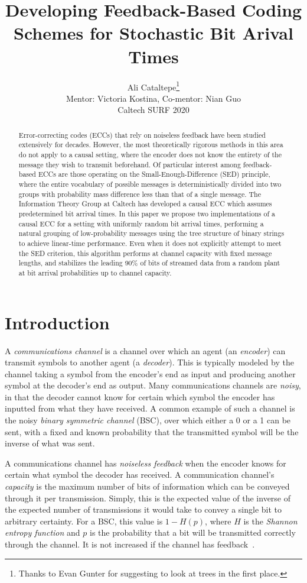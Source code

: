 \documentclass{IEEEtran}
\title{Developing Feedback-Based Coding Schemes for Stochastic Bit Arival
Times}
\author{Ali Cataltepe\thanks{Thanks to Evan Gunter for suggesting to look at
trees in the first place.}\\ Mentor: Victoria Kostina, Co-mentor: Nian Guo\\
Caltech SURF 2020\vspace{-3em}}
\date{}
\begin{document}
\maketitle
\begin{abstract}
Error-correcting codes (ECCs) that rely on noiseless feedback have been
studied extensively for decades. However, the most theoretically rigorous
methods in this area do not apply to a causal setting, where the encoder
does not know the entirety of the message they wish to transmit beforehand.
Of particular interest among feedback-based ECCs are those operating on the
Small-Enough-Difference (SED) principle, where the entire vocabulary of
possible messages is deterministically divided into two groups with probability
mass difference less than that of a single message.
The Information Theory Group at
Caltech has developed a causal ECC which assumes predetermined bit arrival
times. In this paper we propose two implementations of a causal ECC for
a setting with uniformly random bit arrival times, performing a natural
grouping of low-probability messages using the tree structure of binary
strings to achieve linear-time performance. Even when it does not
explicitly	
attempt to
meet the SED criterion, this algorithm performs at channel capacity
with fixed message lengths, and stabilizes the leading 90\% of bits of
streamed data from a random plant at bit arrival probabilities up to channel
capacity.
\end{abstract}
\section{Introduction}
A \textit{communications channel} is a channel over which an
agent (an \textit{encoder}) can transmit symbols to another agent
(a \textit{decoder}).
This is typically modeled by the channel taking a symbol from the encoder's
end as input and producing another symbol at the decoder's end as output.
Many communications channels are \textit{noisy}, in that the decoder cannot
know for certain which symbol the encoder has inputted from what they have
received. A common example of such a channel is the
noisy \textit{binary symmetric channel} (BSC), over which either a 0
or a 1 can be sent, with a fixed and known probability that
the transmitted symbol will be the inverse of what was sent.

A communications
channel has \textit{noiseless feedback} when the encoder knows for certain
what symbol the decoder has received. A communication channel's
\textit{capacity} is the maximum number of bits of information
which can be conveyed through it per transmission. Simply, this is the
expected value of the inverse of the expected number of transmissions it
would take to
convey a single bit to arbitrary certainty. For a BSC, this value is
$1-H(p)$, where $H$ is the
\textit{Shannon entropy function} and $p$ is the probability
that a bit will be transmitted correctly through the channel. It is
not increased if the channel has feedback~\cite{horsteinseq}.
\end{document}

